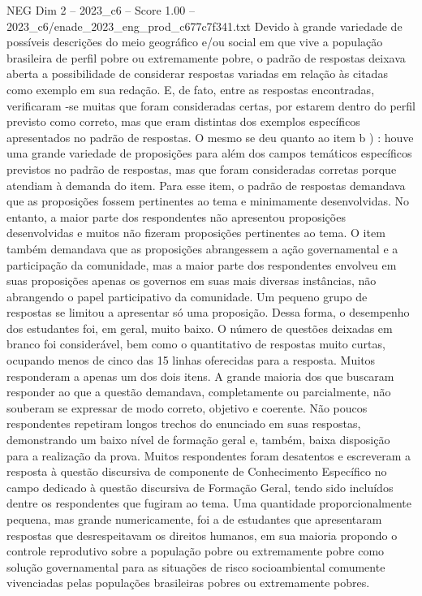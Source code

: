 \begin{textsample}{NEG Dim 2 – 2023\_c6 – Score 1.00 – 2023\_c6/enade\_2023\_eng\_prod\_c677c7f341.txt}
Devido à grande variedade de possíveis descrições do meio geográfico e/ou social em que vive a população brasileira de perfil pobre ou extremamente pobre, o padrão de respostas deixava aberta a possibilidade de considerar respostas variadas em relação às citadas como exemplo em sua redação.
E, de fato, entre as respostas encontradas, verificaram -se muitas que foram consideradas certas, por estarem dentro do perfil previsto como correto, mas que eram distintas dos exemplos específicos apresentados no padrão de respostas.
O mesmo se deu quanto ao item b ) : houve uma grande variedade de proposições para além dos campos temáticos específicos previstos no padrão de respostas, mas que foram consideradas corretas porque atendiam à demanda do item.
Para esse item, o padrão de respostas demandava que as proposições fossem pertinentes ao tema e minimamente desenvolvidas.
No entanto, a maior parte dos respondentes não apresentou proposições desenvolvidas e muitos não fizeram proposições pertinentes ao tema.
O item também demandava que as proposições abrangessem a ação governamental e a participação da comunidade, mas a maior parte dos respondentes envolveu em suas proposições apenas os governos em suas mais diversas instâncias, não abrangendo o papel participativo da comunidade.
Um pequeno grupo de respostas se limitou a apresentar só uma proposição.
Dessa forma, o desempenho dos estudantes foi, em geral, muito baixo.
O número de questões deixadas em branco foi considerável, bem como o quantitativo de respostas muito curtas, ocupando menos de cinco das 15 linhas oferecidas para a resposta.
Muitos responderam a apenas um dos dois itens.
A grande maioria dos que buscaram responder ao que a questão demandava, completamente ou parcialmente, não souberam se expressar de modo correto, objetivo e coerente.
Não poucos respondentes repetiram longos trechos do enunciado em suas respostas, demonstrando um baixo nível de formação geral e, também, baixa disposição para a realização da prova.
Muitos respondentes foram desatentos e escreveram a resposta à questão discursiva de componente de Conhecimento Específico no campo dedicado à questão discursiva de Formação Geral, tendo sido incluídos dentre os respondentes que fugiram ao tema.
Uma quantidade proporcionalmente pequena, mas grande numericamente, foi a de estudantes que apresentaram respostas que desrespeitavam os direitos humanos, em sua maioria propondo o controle reprodutivo sobre a população pobre ou extremamente pobre como solução governamental para as situações de risco socioambiental comumente vivenciadas pelas populações brasileiras pobres ou extremamente pobres.

\end{textsample}
